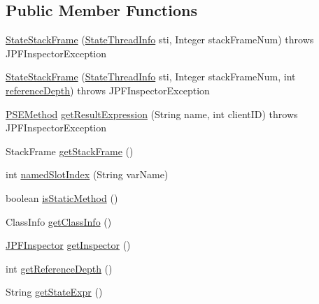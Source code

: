 \subsection*{Public Member Functions}
\begin{DoxyCompactItemize}
\item 
\hyperlink{classgov_1_1nasa_1_1jpf_1_1inspector_1_1server_1_1programstate_1_1_state_stack_frame_aebf2c9692bb56f9ea23cff02d371ecfb}{State\+Stack\+Frame} (\hyperlink{classgov_1_1nasa_1_1jpf_1_1inspector_1_1server_1_1programstate_1_1_state_thread_info}{State\+Thread\+Info} sti, Integer stack\+Frame\+Num)  throws J\+P\+F\+Inspector\+Exception 
\item 
\hyperlink{classgov_1_1nasa_1_1jpf_1_1inspector_1_1server_1_1programstate_1_1_state_stack_frame_a6acda20867257fa87852b4f53d453da3}{State\+Stack\+Frame} (\hyperlink{classgov_1_1nasa_1_1jpf_1_1inspector_1_1server_1_1programstate_1_1_state_thread_info}{State\+Thread\+Info} sti, Integer stack\+Frame\+Num, int \hyperlink{classgov_1_1nasa_1_1jpf_1_1inspector_1_1server_1_1programstate_1_1_state_node_a55683618625dae46e8aa68d95811d6bb}{reference\+Depth})  throws J\+P\+F\+Inspector\+Exception 
\item 
\hyperlink{classgov_1_1nasa_1_1jpf_1_1inspector_1_1common_1_1pse_1_1_p_s_e_method}{P\+S\+E\+Method} \hyperlink{classgov_1_1nasa_1_1jpf_1_1inspector_1_1server_1_1programstate_1_1_state_stack_frame_ae8e2d92b45ea5bf89c13d5493658df4f}{get\+Result\+Expression} (String name, int client\+ID)  throws J\+P\+F\+Inspector\+Exception 
\item 
Stack\+Frame \hyperlink{classgov_1_1nasa_1_1jpf_1_1inspector_1_1server_1_1programstate_1_1_state_stack_frame_abf23907c68e6002f6747743610502b88}{get\+Stack\+Frame} ()
\item 
int \hyperlink{classgov_1_1nasa_1_1jpf_1_1inspector_1_1server_1_1programstate_1_1_state_stack_frame_a22a19c9790fc5c9eb6d2ca8175841e14}{named\+Slot\+Index} (String var\+Name)
\item 
boolean \hyperlink{classgov_1_1nasa_1_1jpf_1_1inspector_1_1server_1_1programstate_1_1_state_stack_frame_af8d21f5657191d521631b0c471fb0c7d}{is\+Static\+Method} ()
\item 
Class\+Info \hyperlink{classgov_1_1nasa_1_1jpf_1_1inspector_1_1server_1_1programstate_1_1_state_stack_frame_a03fa75688eac043d9631e2d72d87cf74}{get\+Class\+Info} ()
\item 
\hyperlink{classgov_1_1nasa_1_1jpf_1_1inspector_1_1server_1_1jpf_1_1_j_p_f_inspector}{J\+P\+F\+Inspector} \hyperlink{classgov_1_1nasa_1_1jpf_1_1inspector_1_1server_1_1programstate_1_1_state_node_af07846313e0632df18008b5bf571f805}{get\+Inspector} ()
\item 
int \hyperlink{classgov_1_1nasa_1_1jpf_1_1inspector_1_1server_1_1programstate_1_1_state_node_af59b1ac0319251e657293c810a16cdd9}{get\+Reference\+Depth} ()
\item 
String \hyperlink{classgov_1_1nasa_1_1jpf_1_1inspector_1_1server_1_1programstate_1_1_state_node_a54c1c8d91f93c078171589f844252bdf}{get\+State\+Expr} ()
\end{DoxyCompactItemize}
